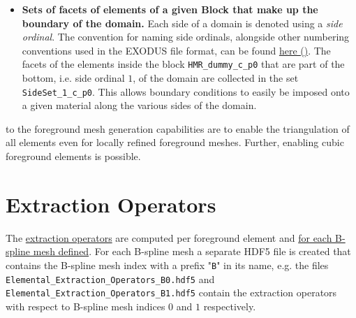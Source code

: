 \begin{itemize}
    \item \textbf{Sets of facets of elements of a given Block that make up the boundary of the domain.} Each side of a domain is denoted using a \emph{side ordinal}. The convention for naming side ordinals, alongside other numbering conventions used in the EXODUS file format, can be found \href{https://sandialabs.github.io/seacas-docs/html/md_include_exodus_element_types.html}{here (\ExternalLink)}.
    The facets of the elements inside the block \texttt{HMR\_dummy\_c\_p0} that are part of the bottom, i.e. side ordinal $1$, of the domain are collected in the set \texttt{SideSet\_1\_c\_p0}. This allows boundary conditions to easily be imposed onto a given material along the various sides of the domain.
\end{itemize}

 to the foreground mesh generation capabilities are to enable the triangulation of all elements even for locally refined foreground meshes. Further, enabling cubic foreground elements is possible.

\section{Extraction Operators}
\label{sec:tutorial_extraction_ops}

The \hyperref[eq:extraction_operator]{extraction operators} are computed per foreground element and \hyperlink{bspline_mesh_definition}{for each B-spline mesh defined}. For each B-spline mesh a separate HDF5 file is created that contains the B-spline mesh index with a prefix "\texttt{B}" in its name, 
\newline e.g. the files \texttt{Elemental\_Extraction\_Operators\_B0.hdf5} and
\newline \texttt{Elemental\_Extraction\_Operators\_B1.hdf5} contain the extraction operators with respect to B-spline mesh indices $0$ and $1$ respectively.


